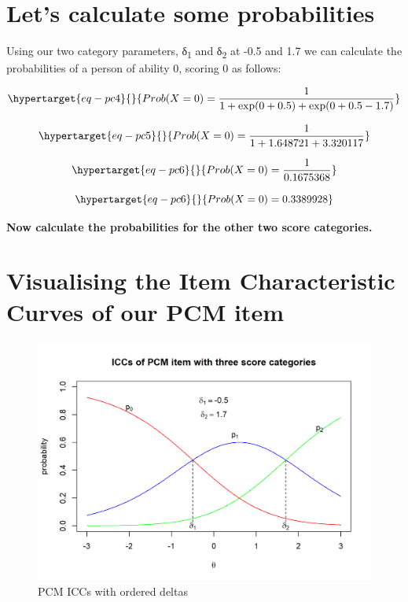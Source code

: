 \documentclass[
  letterpaper,
  DIV=11,
  numbers=noendperiod]{scrreprt}
\begin{document}
\hypertarget{lets-calculate-some-probabilities}{%
\section{Let's calculate some
probabilities}\label{lets-calculate-some-probabilities}}

Using our two category parameters, δ\textsubscript{1} and
δ\textsubscript{2} at -0.5 and 1.7 we can calculate the probabilities of
a person of ability 0, scoring 0 as follows:

\begin{equation}\protect\hypertarget{eq-pc4}{}{
Prob(X=0) = \frac{1}{1+\exp(0 +0.5) + \exp(0 +0.5 -1.7)}
}\label{eq-pc4}\end{equation}

\begin{equation}\protect\hypertarget{eq-pc5}{}{
Prob(X=0) = \frac{1}{1+1.648721 + 3.320117}
}\label{eq-pc5}\end{equation}

\begin{equation}\protect\hypertarget{eq-pc6}{}{
Prob(X=0) = \frac{1}{0.1675368}
}\label{eq-pc6}\end{equation}

\begin{equation}\protect\hypertarget{eq-pc6}{}{
Prob(X=0) = 0.3389928
}\label{eq-pc6}\end{equation}

\textbf{Now calculate the probabilities for the other two score
categories.}

\hypertarget{visualising-the-item-characteristic-curves-of-our-pcm-item}{%
\section{Visualising the Item Characteristic Curves of our PCM
item}\label{visualising-the-item-characteristic-curves-of-our-pcm-item}}

\begin{figure}

{\centering \includegraphics{images/PCM1-1.png}

}

\caption{\label{fig-PCM1}PCM ICCs with ordered deltas}

\end{figure}
\end{document}
